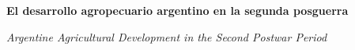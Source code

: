 
\renewcommand{\articuloidiomaxml}{es}
\renewcommand{\articulotitulo}{El desarrollo agropecuario argentino en la segunda posguerra}
\renewcommand{\articulosubtitulo}{Otro artículo sobre agro en la segunda posguerra}
\renewcommand{\articuloautores}{Marcelo Rougier, Alberto Alejandro Moyano}
\renewcommand{\articulodoi}{10.56503/H-Industria/n.37(19)/3473}
\renewcommand{\articulotipo}{ARTÍCULO DE INVESTIGACIÓN}
\renewcommand{\articulorevista}{H-industria}
\renewcommand{\articuloissne}{1851-703X}
\renewcommand{\articulovolumen}{01}
\renewcommand{\articulonumero}{01}
\renewcommand{\articulofecha}{ 2026}
\renewcommand{\articulopagina}{23}

\setcounter{page}{23}
\thispagestyle{firstpage}

\noindent\begin{minipage}[t]{\dimexpr\textwidth+\marginparsep+\marginparwidth\relax}%
{\sffamily\bfseries\Large\articulotitulo\par}%
\end{minipage}\par
\vspace{3mm}%
\renewcommand{\articulotitulotrans}{Argentine Agricultural Development in the Second Postwar Period}
\noindent\begin{minipage}[t]{\dimexpr\textwidth+\marginparsep+\marginparwidth\relax}%
{\sffamily\itshape\normalsize\articulotitulotrans\par}%
\end{minipage}\par
\vspace{4mm}%

